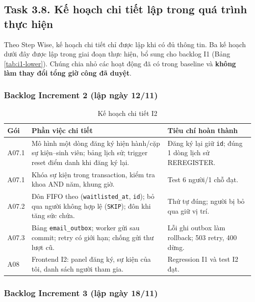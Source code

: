 \subsection{Task 3.8. Kế hoạch chi tiết lập trong quá trình thực hiện}
\label{sec:t3-lower}

Theo Step Wise, kế hoạch chi tiết chỉ được lập khi có đủ thông tin. Ba kế hoạch dưới đây được lập trong giai đoạn thực hiện, bổ sung cho backlog I1 (Bảng \ref{tab:i1-lower}). Chúng chia nhỏ các hoạt động đã có trong baseline và \textbf{không làm thay đổi tổng giờ công đã duyệt}.

\subsubsection{Backlog Increment 2 (lập ngày 12/11)}

\begin{table}[H]
\centering\footnotesize
\caption{Kế hoạch chi tiết I2}\label{tab:t3-lower-i2}
\begin{tabularx}{\linewidth}{@{}p{.09\linewidth}Xp{.32\linewidth}@{}}
\toprule
\textbf{Gói} & \textbf{Phần việc chi tiết} & \textbf{Tiêu chí hoàn thành}\\\midrule
A07.1 & Mô hình một dòng đăng ký hiện hành/cặp sự kiện--sinh viên; bảng lịch sử; trigger reset điểm danh khi đăng ký lại. & Đăng ký lại giữ \texttt{id}; đúng 1 dòng lịch sử REREGISTER.\\
A07.1 & Khóa sự kiện trong transaction, kiểm tra khoa AND năm, khung giờ. & Test 6 người/1 chỗ đạt.\\
A07.2 & Đôn FIFO theo (\texttt{waitlisted\_at}, \texttt{id}); bỏ qua người không hợp lệ (\texttt{SKIP}); đôn khi tăng sức chứa. & Thứ tự đúng; người bị bỏ qua giữ vị trí.\\
A07.3 & Bảng \texttt{email\_outbox}; worker gửi sau commit; retry có giới hạn; chống gửi thư lượt cũ. & Lỗi ghi outbox làm rollback; 503 retry, 400 dừng.\\
A08 & Frontend I2: panel đăng ký, sự kiện của tôi, danh sách người tham gia. & Regression I1 và test I2 đạt.\\
\bottomrule
\end{tabularx}
\end{table}

\subsubsection{Backlog Increment 3 (lập ngày 18/11)}

